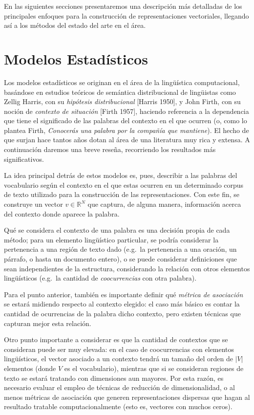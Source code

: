 En las siguientes secciones presentaremos una descripción más detalladas de los principales enfoques
para la construcción de representaciones vectoriales, llegando así a los métodos del estado del arte
en el área.


\section{Modelos Estadísticos}

Los modelos estadísticos se originan en el área de la lingüística computacional, basándose en
estudios teóricos de semántica distribucional de lingüistas como Zellig Harris, con su
\textit{hipótesis distribucional} [Harris 1950], y John Firth, con su noción de \textit{contexto de
situación} [Firth 1957], haciendo referencia a la dependencia que tiene el significado de las
palabras del contexto en el que ocurren (o, como lo plantea Firth, \textit{Conocerás una palabra por
la compañía que mantiene}). El hecho de que surjan hace tantos años dotan al área de una literatura
muy rica y extensa. A continuación daremos una breve reseña, recorriendo los resultados más
significativos.

La idea principal detrás de estos modelos es, pues, describir a las palabras del vocabulario según
el contexto en el que estas ocurren en un determinado corpus de texto utilizado para la construcción
de las representaciones. Con este fin, se construye un vector $v \in \mathbb{R}^N$ que captura, de
alguna manera, información acerca del contexto donde aparece la palabra.

Qué se considera el contexto de una palabra es una decisión propia de cada método; para un elemento
lingüístico particular, se podría considerar la pertenencia a una región de texto dado (e.g.\ la
pertenencia a una oración, un párrafo, o hasta un documento entero), o se puede considerar
definiciones que sean independientes de la estructura, considerando la relación con otros elementos
lingüísticos (e.g.\ la cantidad de \textit{coocurrencias} con otra palabra).

Para el punto anterior, también es importante definir qué \textit{métrica de asociación} se estará
midiendo respecto al contexto elegido: el caso más básico es contar la cantidad de ocurrencias de la
palabra dicho contexto, pero existen técnicas que capturan mejor esta relación.

Otro punto importante a considerar es que la cantidad de contextos que se consideran puede ser muy
elevada: en el caso de coocurrencias con elementos lingüísticos, el vector asociado a un contexto
tendrá un tamaño del orden de $|V|$ elementos (donde $V$ es el vocabulario), mientras que si se
consideran regiones de texto se estará tratando con dimensiones aun mayores. Por esta razón, es
necesario evaluar el empleo de técnicas de reducción de dimensionalidad, o al menos métricas de
asociación que generen representaciones dispersas que hagan al resultado tratable computacionalmente
(esto es, vectores con muchos ceros).

